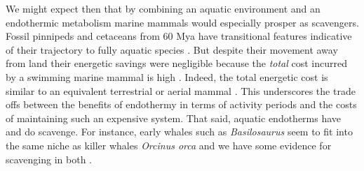 \documentclass[a4paper,12pt]{article}
\begin{document}
We might expect then that by combining an aquatic environment and an endothermic metabolism marine mammals would especially prosper as scavengers.
Fossil pinnipeds and cetaceans from 60 Mya %
have transitional features indicative of their trajectory to fully aquatic species \citep{williams1999evolution}.  
But despite their movement away from land their energetic savings were negligible because the \textit{total} cost incurred by a swimming marine mammal is high \citep{williams1999evolution}. 
Indeed, the total energetic cost is similar to an equivalent terrestrial or aerial mammal \citep{williams1999evolution}.
This underscores the trade offs between the benefits of endothermy in terms of activity periods and the costs of maintaining such an expensive system. 
That said, aquatic endotherms have and do scavenge. 
For instance, early whales such as \textit{Basilosaurus} seem to fit into the same niche as killer whales \textit{Orcinus orca} and we have some evidence for scavenging in both \citep{fahlke2012bite,Whitehead415}.
\end{document}
